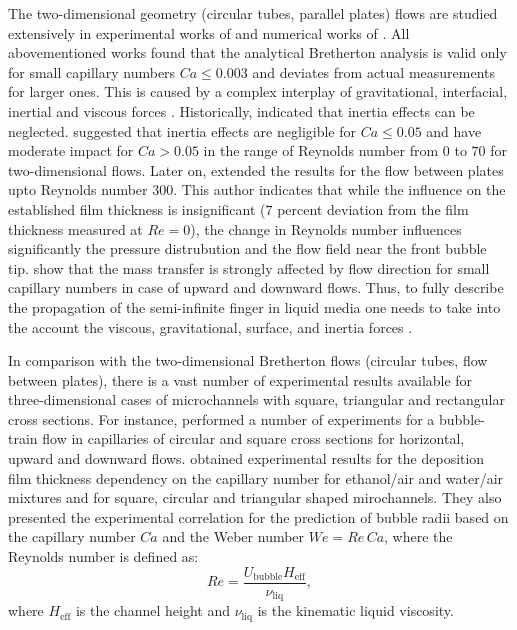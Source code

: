 \documentclass{article}
\begin{document}
The two-dimensional geometry (circular tubes, parallel plates) flows are studied extensively in
experimental works of \citet{aussillous-deposition, cerro-bubble-train} and numerical works of
\citet{giavedoni-numerical,heil-bretherton}. All abovementioned works found that the analytical
Bretherton
analysis is valid only for small capillary numbers $Ca\leq 0.003$ and deviates from actual
measurements for larger ones.
This is caused by a complex interplay of gravitational,
interfacial, inertial and viscous forces \cite{gupta-review}. Historically, 
\citet{bretherton} indicated that inertia effects can be 
neglected. \citet{giavedoni-numerical} suggested
that
inertia effects
are negligible for $Ca \leq 0.05$ and have moderate impact for $Ca>0.05$ in the range of Reynolds
number from $0$ to $70$ for two-dimensional flows. Later on, \citet{heil-bretherton}
extended
the results for the flow between plates upto Reynolds number
$300$. This author indicates that while the influence on the established film thickness is
insignificant
($7$ percent deviation from the film thickness measured at $Re=0$), the change in Reynolds number 
influences significantly the pressure distrubution and the flow field near the front bubble tip.
\citet{cerro-bubble-train} show that the mass transfer is strongly affected by flow direction for
small capillary numbers in case of upward and downward flows. Thus, to fully describe the
propagation of the semi-infinite finger in liquid media one needs to take into the account the
viscous, gravitational, surface, and inertia forces \cite{gupta-review}.  

In comparison with the two-dimensional Bretherton flows (circular tubes, flow between plates), there
is a vast number of experimental
results available for three-dimensional cases of microchannels with square, triangular and
rectangular cross sections. For instance, \citet{cerro-bubble-train} performed a number of
experiments for a
bubble-train flow in capillaries of
circular and square cross sections for horizontal, upward and downward flows.
\citet{shikazono-square} obtained
experimental
results for the deposition film thickness dependency on the
capillary number for ethanol/air and water/air mixtures and for square, circular and triangular
shaped mirochannels. They also presented the experimental correlation for the prediction of bubble
radii
based on the capillary number $Ca$ and the Weber number $We=Re\,Ca$, where the Reynolds number is
defined as:
\begin{equation}
Re=\frac{U_{\mathrm{bubble}} H_{\mathrm{eff}}}{\nu_{\mathrm{liq}}},
\end{equation}
where $H_{\mathrm{eff}}$ is the channel height and $\nu_{\mathrm{liq}}$ is the kinematic liquid
viscosity.
\end{document}
